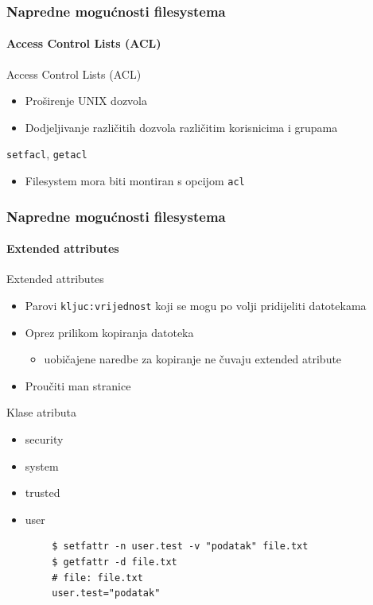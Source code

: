 \documentclass[t]{beamer}
\begin{document}
\begin{frame}
	\frametitle{Napredne mogućnosti filesystema}
	\framesubtitle{Access Control Lists (ACL)}
	Access Control Lists (ACL)
	\begin{itemize}
		\item Proširenje UNIX dozvola
		\item Dodjeljivanje različitih dozvola različitim korisnicima i grupama
	\end{itemize}
	\vspace{1em}
	\texttt{setfacl}, \texttt{getacl}
	\vspace{1em}
	\begin{itemize}
		\item Filesystem mora biti montiran s opcijom \texttt{acl}
	\end{itemize}
\end{frame}

\begin{frame}[fragile]
	\frametitle{Napredne mogućnosti filesystema}
	\framesubtitle{Extended attributes}
	Extended attributes
	\begin{itemize}
		\item Parovi \texttt{kljuc:vrijednost} koji se mogu po volji pridijeliti datotekama
		\item Oprez prilikom kopiranja datoteka
		\begin{itemize} 
			\item uobičajene naredbe za kopiranje ne čuvaju extended atribute
		\end{itemize}
		\item Proučiti man stranice
	\end{itemize}
	Klase atributa
	\begin{multicols}{2}
		\begin{itemize}
			\item security
			\item system
			\item trusted
			\item user
		\end{itemize}
	\end{multicols}
	{\footnotesize \begin{verbatim}
		$ setfattr -n user.test -v "podatak" file.txt
		$ getfattr -d file.txt
		# file: file.txt
		user.test="podatak"
		\end{verbatim}}
\end{frame}
\end{document}

